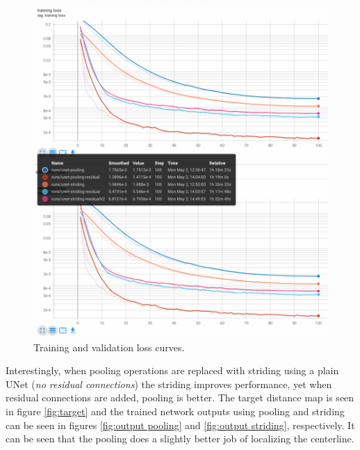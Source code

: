 \documentclass[10pt,twocolumn,letterpaper]{article}
\begin{document}
\begin{figure}[!h]
    \begin{center}
       \includegraphics[width=0.95\linewidth]{figures/losses.png}
    \end{center}
       \caption{Training and validation loss curves.}
    \label{fig:losses}
\end{figure}


Interestingly, when pooling operations are replaced with striding using a plain UNet (\emph{no residual connections}) the striding improves performance, yet when residual connections are added, pooling is better. The target distance map is seen in figure \ref{fig:target} and the trained network outputs using pooling and striding can be seen in figures \ref{fig:output pooling} and \ref{fig:output striding}, respectively. It can be seen that the pooling does a slightly better job of localizing the centerline.
\end{document}
